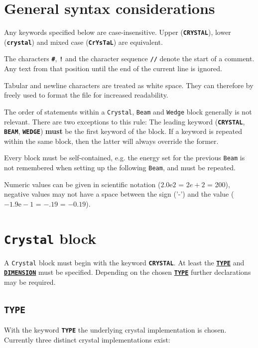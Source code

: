 \documentclass[a4paper]{article}
\newcommand{\Class}[1]{\texttt{#1}\xspace}
\newcommand{\Keyword}[1]{\texttt{\textbf{#1}}\xspace}
\newcommand{\SB}{\\[0.2em]}
\begin{document}
\section{General syntax considerations}

Any keywords specified below are case-insensitive. Upper (\Keyword{CRYSTAL}), lower (\Keyword{crystal}) and mixed case (\Keyword{CrYsTaL}) are equivalent.

The characters \Keyword{\#}, \Keyword{!} and the character sequence \Keyword{//} denote the start of a comment.
Any text from that position until the end of the current line is ignored.

Tabular and newline characters are treated as white space.
They can therefore by freely used to format the file for increased readability.

The order of statements within a \Class{Crystal}, \Class{Beam} and \Class{Wedge} block generally is not relevant.
There are two exceptions to this rule: The leading keyword (\Keyword{CRYSTAL}, \Keyword{BEAM}, \Keyword{WEDGE}) \textbf{must} be the first keyword of the block. If a keyword is repeated within the same block, then
the latter will always override the former.

Every block must be self-contained, e.g. the energy set for the previous \Class{Beam} is not remembered when setting up the following \Class{Beam}, and must be repeated.

Numeric values can be given in scientific notation ($2.0\mbox{e}2$ = $2e+2$ = 200), negative values may not have a space between the sign ('-') and the value ($-1.9\mbox{e}-1$ = $-.19$ = $-0.19$).
\label{numberspec}

\section{\Class{Crystal} block}

A \Class{Crystal} block must begin with the keyword \Keyword{CRYSTAL}.
At least the \hyperref[crystaltype]{\Keyword{TYPE}} and \hyperref[crystaldimension]{\Keyword{DIMENSION}} must be specified.
Depending on the chosen \hyperref[crystaltype]{\Keyword{TYPE}} further declarations may be required.


\subsection{\Keyword{TYPE}}
\label{crystaltype}
With the keyword \Keyword{TYPE} the underlying crystal implementation is chosen.
Currently three distinct crystal implementations exist:\SB
\end{document}
